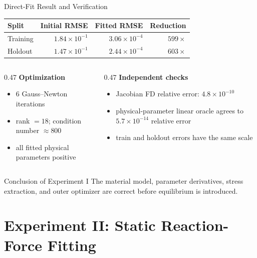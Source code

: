\documentclass[aspectratio=169,10pt]{beamer}
\begin{document}
\begin{frame}{Direct-Fit Result and Verification}
  \small
  \begin{table}
    \centering
    \begin{tabular}{lrrr}
      \toprule
      Split & Initial RMSE & Fitted RMSE & Reduction \\
      \midrule
      Training & $1.84\times10^{-1}$ & $3.06\times10^{-4}$ & $599\times$ \\
      Holdout & $1.47\times10^{-1}$ & $2.44\times10^{-4}$ & $603\times$ \\
      \bottomrule
    \end{tabular}
  \end{table}

  \vspace{0.5em}
  \begin{columns}[T,onlytextwidth]
    \begin{column}{0.47\linewidth}
      \textbf{Optimization}
      \begin{itemize}
        \item 6 Gauss--Newton iterations
        \item rank $=18$; condition number $\approx800$
        \item all fitted physical parameters positive
      \end{itemize}
    \end{column}
    \begin{column}{0.47\linewidth}
      \textbf{Independent checks}
      \begin{itemize}
        \item Jacobian FD relative error: $4.8\times10^{-10}$
        \item physical-parameter linear oracle agrees to
          $5.7\times10^{-14}$ relative error
        \item train and holdout errors have the same scale
      \end{itemize}
    \end{column}
  \end{columns}

  \begin{block}{Conclusion of Experiment I}
    The material model, parameter derivatives, stress extraction, and outer
    optimizer are correct before equilibrium is introduced.
  \end{block}
\end{frame}

\section{Experiment II: Static Reaction-Force Fitting}
\end{document}
